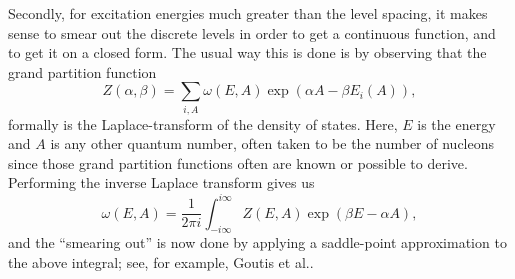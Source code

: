 Secondly, for excitation energies much greater than the level spacing, it makes sense to smear out the discrete levels in order to get a continuous function, and to get it on a closed form. The usual way this is done is by observing that the grand partition function 
\begin{equation}
Z(\alpha,\beta) = \sum_{i,A} \omega(E,A) \exp{(\alpha A - \beta E_i(A))},
\end{equation}
formally is the Laplace-transform of the density of states.
Here, $E$ is the energy and $A$ is any other quantum number, often taken to be the number of nucleons since those grand partition functions often are known or possible to derive.
Performing the inverse Laplace transform gives us
\begin{equation}
\omega(E,A) = \frac{1}{2\pi i} \int_{-i\infty}^{i\infty} Z(E,A)\exp{(\beta E - \alpha A)},
\end{equation} 
and the ``smearing out'' is now done by applying a saddle-point approximation to the above integral; see, for example,  Goutis et al.\cite{saddle1999}.

